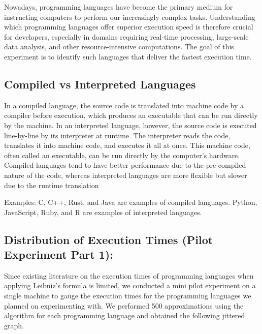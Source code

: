 \documentclass[12pt,halfline,a4paper,]{ouparticle}
\begin{document}
Nowadays, programming languages have become the primary medium for
instructing computers to perform our increasingly complex tasks.
Understanding which programming languages offer superior execution speed
is therefore crucial for developers, especially in domains requiring
real-time processing, large-scale data analysis, and other
resource-intensive computations. The goal of this experiment is to
identify such languages that deliver the fastest execution time.

\subsection{Compiled vs Interpreted
Languages}\label{compiled-vs-interpreted-languages}

In a compiled language, the source code is translated into machine code
by a compiler before execution, which produces an executable that can be
run directly by the machine. In an interpreted language, however, the
source code is executed line-by-line by its interpreter at runtime. The
interpreter reads the code, translates it into machine code, and
executes it all at once. This machine code, often called an executable,
can be run directly by the computer's hardware. Compiled languages tend
to have better performance due to the pre-compiled nature of the code,
whereas interpreted languages are more flexible but slower due to the
runtime translation

Examples: C, C++, Rust, and Java are examples of compiled languages.
Python, JavaScript, Ruby, and R are examples of interpreted languages.
\newpage

\subsection{Distribution of Execution Times (Pilot Experiment Part
1):}\label{distribution-of-execution-times-pilot-experiment-part-1}

Since existing literature on the execution times of programming
languages when applying Leibniz's formula is limited, we conducted a
mini pilot experiment on a single machine to gauge the execution times
for the programming languages we planned on experimenting with. We
performed 500 approximations using the algorithm for each programming
language and obtained the following jittered graph.
\end{document}
